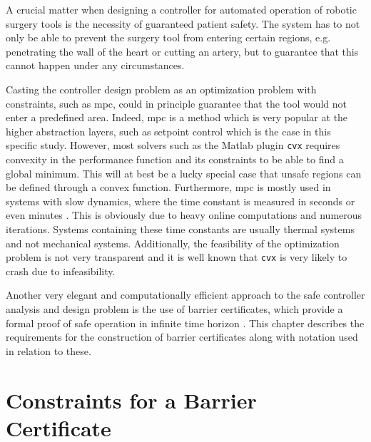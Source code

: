 A crucial matter when designing a controller for automated operation of robotic surgery tools is the necessity of guaranteed patient safety. The system has to not only be able to prevent the surgery tool from entering certain regions, e.g. penetrating the wall of the heart or cutting an artery, but to guarantee that this cannot happen under any circumstances.

Casting the controller design problem as an optimization problem with constraints, such as \gls{mpc}, could in principle guarantee that the tool would not enter a predefined area. Indeed, \gls{mpc} is a method which is very popular at the higher abstraction layers, such as setpoint control \citep{bib:mpc_simon} which is the case in this specific study. However, most solvers such as the Matlab plugin \texttt{cvx} requires convexity in the performance function and its constraints to be able to find a global minimum. This will at best be a lucky special case that unsafe regions can be defined through a convex function.  Furthermore, \gls{mpc} is mostly used in systems with slow dynamics, where the time constant is measured in seconds or even minutes \citep{bib:mpc_slow}. This is obviously due to heavy online computations and numerous iterations. Systems containing these time constants are usually thermal systems and not mechanical systems. Additionally, the feasibility of the optimization problem is not very transparent and it is well known that \texttt{cvx} is very likely to crash due to infeasibility.

Another very elegant and computationally efficient approach to the safe controller analysis and design problem is the use of barrier certificates, which provide a formal proof of safe operation in infinite time horizon \citep{bib:barrier_prajna,bib:safety}. This chapter describes the requirements for the construction of barrier certificates along with notation used in relation to these.
%





\section{Constraints for a Barrier Certificate}\label{sec:safety-def}

